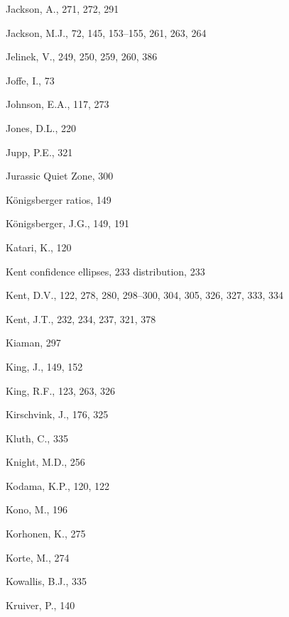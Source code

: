 \documentclass[,plain]{tauxe}
\begin{document}
\begin{theindex}
  \indexspace

  \item Jackson, A., 271, 272, 291
  \item Jackson, M.J., 72, 145, 153--155, 261, 263, 264
  \item Jelinek, V., 249, 250, 259, 260, 386
  \item Joffe, I., 73
  \item Johnson, E.A., 117, 273
  \item Jones, D.L., 220
  \item Jupp, P.E., 321
  \item Jurassic Quiet Zone, 300

  \indexspace

  \item K\"onigsberger ratios, 149
  \item K\"onigsberger, J.G., 149, 191
  \item Katari, K., 120
  \item Kent
    \subitem confidence ellipses, 233
    \subitem distribution, 233
  \item Kent, D.V., 122, 278, 280, 298--300, 304, 305, 326, 327, 
		333, 334
  \item Kent, J.T., 232, 234, 237, 321, 378
  \item Kiaman, 297
  \item King, J., 149, 152
  \item King, R.F., 123, 263, 326
  \item Kirschvink, J., 176, 325
  \item Kluth, C., 335
  \item Knight, M.D., 256
  \item Kodama, K.P., 120, 122
  \item Kono, M., 196
  \item Korhonen, K., 275
  \item Korte, M., 274
  \item Kowallis, B.J., 335
  \item Kruiver, P., 140

  \indexspace


\end{theindex}
\end{document}
